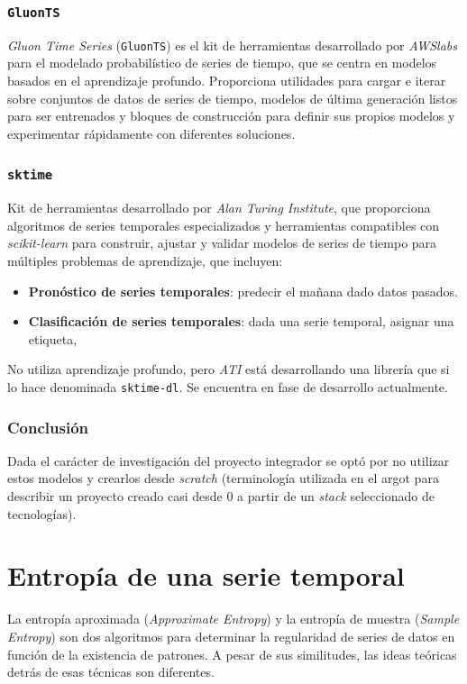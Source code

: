 \documentclass[a4paper,12pt]{article}
\begin{document}
\subsubsection{\texttt{GluonTS}}
\textit{Gluon Time Series} (\texttt{GluonTS}) es el kit de herramientas desarrollado por \textit{AWSlabs} para el modelado probabilístico de series de tiempo, que se centra en modelos basados ​​en el aprendizaje profundo. Proporciona utilidades para cargar e iterar sobre conjuntos de datos de series de tiempo, modelos de última generación listos para ser entrenados y bloques de construcción para definir sus propios modelos y experimentar rápidamente con diferentes soluciones. \citep{gluonts}

\subsubsection{\texttt{sktime}}
Kit de herramientas desarrollado por \textit{Alan Turing Institute}, que proporciona algoritmos de series temporales especializados y herramientas compatibles con \textit{scikit-learn} para construir, ajustar y validar modelos de series de tiempo para múltiples problemas de aprendizaje, que incluyen: \citep{sktime}

\begin{itemize}[noitemsep, topsep=2pt]
	\item \textbf{Pronóstico de series temporales}: predecir el mañana dado datos pasados.
	\item \textbf{Clasificación de series temporales}: dada una serie temporal, asignar una etiqueta,
\end{itemize}

No utiliza aprendizaje profundo, pero \textit{ATI} está desarrollando una librería que si lo hace denominada \texttt{sktime-dl}. Se encuentra en fase de desarrollo actualmente.

\subsubsection{Conclusión}

Dada el carácter de investigación del proyecto integrador se optó por no utilizar estos modelos y crearlos desde \textit{scratch} (terminología utilizada en el argot para describir un proyecto creado casi desde 0 a partir de un \textit{stack} seleccionado de tecnologías).

\clearpage

\section{Entropía de una serie temporal} \label{sec:entropy}
La entropía aproximada (\textit{Approximate Entropy}) y la entropía de muestra (\textit{Sample Entropy}) son dos algoritmos para determinar la regularidad de series de datos en función de la existencia de patrones. A pesar de sus similitudes, las ideas teóricas detrás de esas técnicas son diferentes. \citep{delgado2019approximate}
\end{document}

